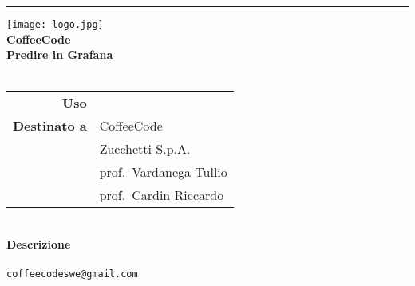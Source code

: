 
\begin{titlepage}%

  \raggedleft%
  \rule{1pt}{\textheight}%
  \hspace{0.05\textwidth}%
  \parbox[b]{0.75\textwidth}{%
  {\hspace{0.15\textwidth}\texttt{[image: logo.jpg]}}\\[3\baselineskip] %
  {\Huge\bfseries CoffeeCode \\[1\baselineskip] Predire in Grafana}\\[8\baselineskip] %
  {\Large\textsc{\placeholderTitle{}}}\\[7\baselineskip] %
  {\begin{tabular}{r l}
    \textbf{Uso}          & \uso{}                    \\
    \textbf{Destinato a}  & CoffeeCode                \\
    					  & Zucchetti S.p.A.		  \\
                          & prof.\ Vardanega Tullio   \\
                          & prof.\ Cardin Riccardo    \\
  \end{tabular}}\\[5\baselineskip]

  {\bfseries Descrizione}\\
  {\descrizione{}}\\[1\baselineskip]
  {\texttt{coffeecodeswe@gmail.com}}\\[\baselineskip] %
  }

\end{titlepage}


\setlength{\headheight}{1.8cm}

\newpage
\pagestyle{nopage}

\setcounter{table}{-1}

\newpage
\thispagestyle{nopage}
\tableofcontents

\elencoFigure{}%

\newpage

\pagestyle{usual}
